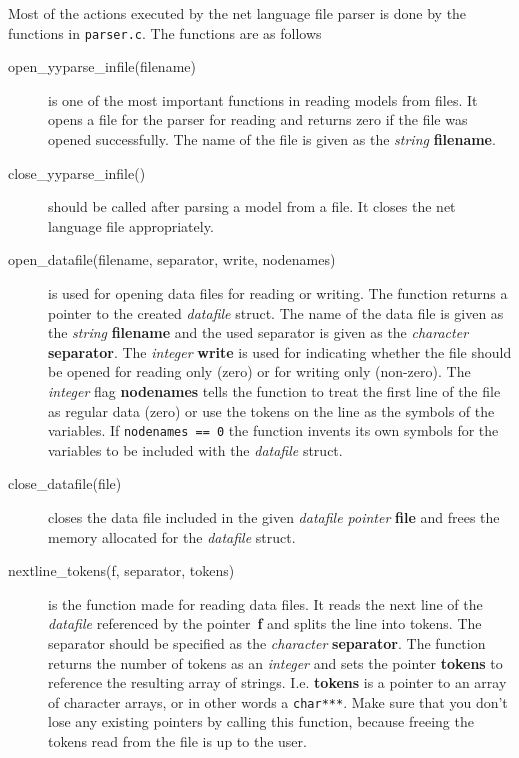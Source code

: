 \documentclass[12pt,a4paper]{report}
\begin{document}
Most of the actions executed by the net language file parser is done by the
functions in \verb+parser.c+. The functions are as follows
\begin{description}
\item[open\_yyparse\_infile(filename)] is one of the most important
functions in reading models from files. It opens a file for the parser
for reading and returns zero if the file was opened successfully. The 
name of the file is given as the {\it string} \textbf{filename}.

\item[close\_yyparse\_infile()] should be called after parsing a model
from a file. It closes the net language file appropriately.

\item[open\_datafile(filename, separator, write, nodenames)] is used
for opening data files for reading or writing. The function returns a 
pointer to the created {\it datafile} struct. The name of the data
file is given as the {\it string} \textbf{filename} and the used
separator is given as the {\it character} \textbf{separator}. The 
{\it integer} \textbf{write} is used for indicating whether the file
should be opened for reading only (zero) or for writing only
(non-zero). The {\it integer} flag \textbf{nodenames} tells the 
function to treat the first line of the file as regular data (zero) or
use the tokens on the line as the symbols of the variables. If 
\verb+nodenames == 0+ the function invents its own symbols for the
variables to be included with the {\it datafile} struct.

\item[close\_datafile(file)] closes the data file included in the
given {\it datafile pointer} \textbf{file} and frees the memory
allocated for the {\it datafile} struct.

\item[nextline\_tokens(f, separator, tokens)] is the function made for
reading data files. It reads the next line of the {\it datafile}
referenced by the pointer~\textbf{f} and splits the line into
tokens. The separator should be specified as the {\it character}
\textbf{separator}. The function returns the number of tokens as an 
{\it integer} and sets the pointer \textbf{tokens} to reference the
resulting {array of strings}. I.e. \textbf{tokens} is a pointer to an
array of character arrays, or in other words a \verb+char***+. Make
sure that you don't lose any existing pointers by calling this
function, because freeing the tokens read from the file is up to the 
user.


\end{description}
\end{document}
